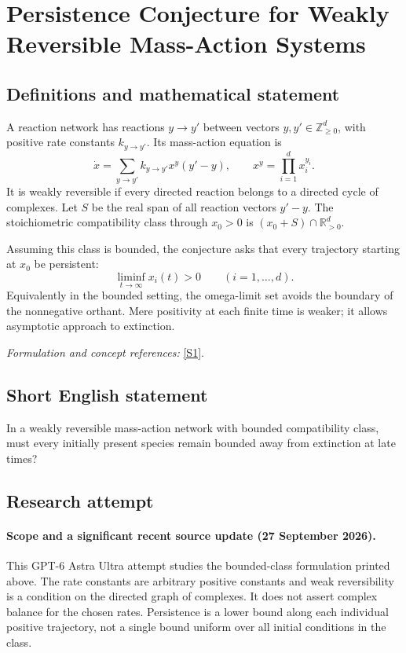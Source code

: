 \documentclass[11pt]{article}
\begin{document}
\section*{\texorpdfstring{Persistence Conjecture for Weakly Reversible Mass-Action Systems}{Persistence Conjecture for Weakly Reversible Mass-Action Systems}}\label{30006961}
\subsection{Definitions and mathematical statement}
A reaction network has reactions $y\to y'$ between vectors $y,y'\in{\mathbb{Z}}_{\ge0}^d$, with positive rate constants $k_{y\to y'}$. Its mass-action equation is
\[
 \dot x=\sum_{y\to y'}k_{y\to y'}x^y(y'-y),
 \qquad x^y=\prod_{i=1}^dx_i^{y_i}.
\]
It is weakly reversible if every directed reaction belongs to a directed cycle of complexes. Let $S$ be the real span of all reaction vectors $y'-y$. The stoichiometric compatibility class through $x_0>0$ is $(x_0+S)\cap{\mathbb{R}}_{>0}^d$.

Assuming this class is bounded, the conjecture asks that every trajectory starting at $x_0$ be persistent:
\[
 \liminf_{t\to\infty}x_i(t)>0\qquad(i=1,\ldots,d).
\]
Equivalently in the bounded setting, the omega-limit set avoids the boundary of the nonnegative orthant. Mere positivity at each finite time is weaker; it allows asymptotic approach to extinction.
\par\smallskip\textit{Formulation and concept references:} \href{https://reaction-networks.net/wiki/Persistence_and_the_Global_Attractor_Conjecture}{[S1]}.

\subsection{Short English statement}
In a weakly reversible mass-action network with bounded compatibility class, must every initially present species remain bounded away from extinction at late times?
\subsection{Research attempt}

\paragraph{Scope and a significant recent source update (27 September 2026).}
This GPT-6 Astra Ultra attempt studies the bounded-class formulation
printed above. The rate constants are arbitrary positive constants and
weak reversibility is a condition on the directed graph of complexes.
It does not assert complex balance for the chosen rates. Persistence is
a lower bound along each individual positive trajectory, not a single
bound uniform over all initial conditions in the class.
\end{document}
